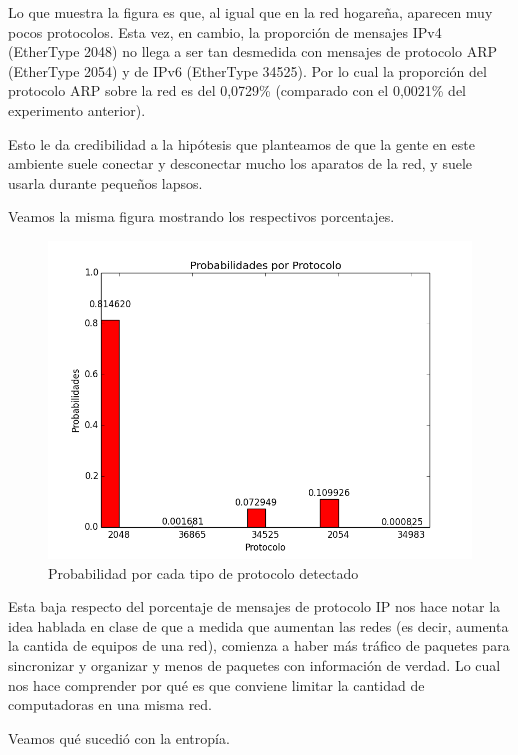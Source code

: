 Lo que muestra la figura es que, al igual que en la red hogare\~na, aparecen muy pocos protocolos. Esta vez, en cambio, la proporci\'on de mensajes IPv4 (EtherType 2048) no llega a ser tan desmedida con mensajes de protocolo ARP (EtherType 2054) y de IPv6 (EtherType 34525). Por lo cual la proporci\'on del protocolo ARP sobre la red es del 0,0729\% (comparado con el 0,0021\% del experimento anterior).\newline

Esto le da credibilidad a la hip\'otesis que planteamos de que la gente en este ambiente suele conectar y desconectar mucho los aparatos de la red, y suele usarla durante peque\~nos lapsos.\newline

\newpage

Veamos la misma figura mostrando los respectivos porcentajes.

\begin{figure}[h!]
\centering
\includegraphics[width=0.7\linewidth]{imagenes/exp2/2probabilidadProtocolo}
\caption{Probabilidad por cada tipo de protocolo detectado}
\label{exp1grafico1}
\end{figure}

Esta baja respecto del porcentaje de mensajes de protocolo IP nos hace notar la idea hablada en clase de que a medida que aumentan las redes (es decir, aumenta la cantida de equipos de una red), comienza a haber m\'as tr\'afico de paquetes para sincronizar y organizar y menos de paquetes con informaci\'on de verdad. Lo cual nos hace comprender por qu\'e es que conviene limitar la cantidad de computadoras en una misma red.

Veamos qu\'e sucedi\'o con la entrop\'ia.

